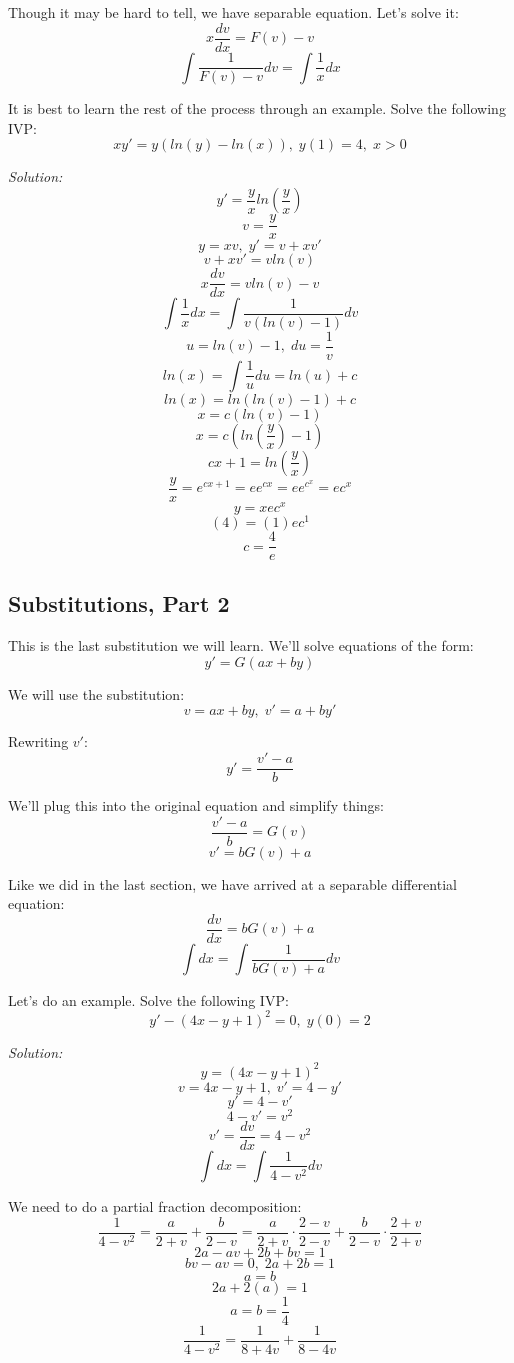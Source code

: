 Though it may be hard to tell, we have separable equation. Let's solve it:
$$x\frac{dv}{dx} = F(v) - v$$
$$\int \frac{1}{F(v) - v}dv = \int \frac{1}{x}dx$$

It is best to learn the rest of the process through an example. Solve the following IVP:
$$xy' = y(ln(y) - ln(x)),\; y(1) = 4,\; x > 0$$

\textit{Solution:}
$$y' = \frac{y}{x}ln\left(\frac{y}{x}\right)$$
$$v = \frac{y}{x}$$
$$y = xv,\; y' = v + xv'$$
$$v + xv' = vln(v)$$
$$x\frac{dv}{dx} = vln(v) - v$$
$$\int \frac{1}{x}dx = \int \frac{1}{v(ln(v) - 1)}dv$$
$$u = ln(v) - 1,\; du = \frac{1}{v}$$
$$ln(x) = \int \frac{1}{u}du = ln(u) + c$$
$$ln(x) = ln(ln(v) - 1) + c$$
$$x = c(ln(v) - 1)$$
$$x = c\left(ln\left(\frac{y}{x}\right) - 1\right)$$
$$cx + 1 = ln\left(\frac{y}{x}\right)$$
$$\frac{y}{x} = e^{cx + 1} = ee^{cx} = ee^{c^{x}} = ec^{x}$$
$$y = xec^{x}$$
$$(4) = (1)ec^{1}$$
$$c = \frac{4}{e}$$
\begin{center}
\end{center}

\subsection{Substitutions, Part 2}
This is the last substitution we will learn. We'll solve equations of the form:
$$y' = G(ax + by)$$

We will use the substitution:
$$v = ax + by,\; v' = a + by'$$

Rewriting $v'$:
$$y' = \frac{v' - a}{b}$$

We'll plug this into the original equation and simplify things:
$$\frac{v' - a}{b} = G(v)$$
$$v' = bG(v) + a$$

Like we did in the last section, we have arrived at a separable differential equation:
$$\frac{dv}{dx} = bG(v) + a$$
$$\int dx = \int \frac{1}{bG(v) + a}dv$$

Let's do an example. Solve the following IVP:
$$y' - (4x - y + 1)^{2} = 0,\; y(0) = 2$$

\textit{Solution:}
$$y = (4x - y + 1)^{2}$$
$$v = 4x - y + 1,\; v' = 4 - y'$$
$$y' = 4 - v'$$
$$4 - v' = v^{2}$$
$$v' = \frac{dv}{dx} = 4 - v^{2}$$
$$\int dx = \int \frac{1}{4 - v^{2}}dv$$

We need to do a partial fraction decomposition:
$$\frac{1}{4 - v^{2}} = \frac{a}{2 + v} + \frac{b}{2 - v} = \frac{a}{2 + v}\cdot\frac{2 - v}{2 - v} + \frac{b}{2 - v}\cdot\frac{2 + v}{2 + v}$$
$$2a - av + 2b + bv = 1$$
$$bv - av = 0,\; 2a + 2b = 1$$
$$a = b$$
$$2a + 2(a) = 1$$
$$a = b = \frac{1}{4}$$
$$\frac{1}{4 - v^{2}} = \frac{1}{8 + 4v} + \frac{1}{8 - 4v}$$

